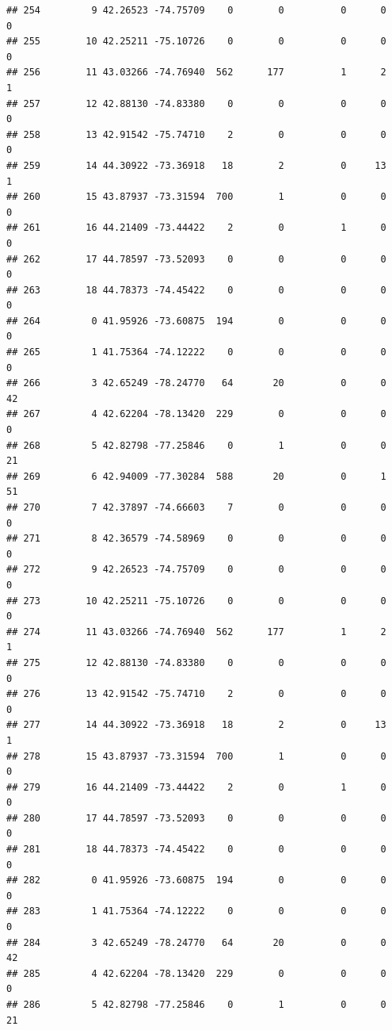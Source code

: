 \documentclass[
]{article}
\begin{document}
\begin{verbatim}
## 254         9 42.26523 -74.75709    0        0          0      0            0
## 255        10 42.25211 -75.10726    0        0          0      0            0
## 256        11 43.03266 -74.76940  562      177          1      2            1
## 257        12 42.88130 -74.83380    0        0          0      0            0
## 258        13 42.91542 -75.74710    2        0          0      0            0
## 259        14 44.30922 -73.36918   18        2          0     13            1
## 260        15 43.87937 -73.31594  700        1          0      0            0
## 261        16 44.21409 -73.44422    2        0          1      0            0
## 262        17 44.78597 -73.52093    0        0          0      0            0
## 263        18 44.78373 -74.45422    0        0          0      0            0
## 264         0 41.95926 -73.60875  194        0          0      0            0
## 265         1 41.75364 -74.12222    0        0          0      0            0
## 266         3 42.65249 -78.24770   64       20          0      0           42
## 267         4 42.62204 -78.13420  229        0          0      0            0
## 268         5 42.82798 -77.25846    0        1          0      0           21
## 269         6 42.94009 -77.30284  588       20          0      1           51
## 270         7 42.37897 -74.66603    7        0          0      0            0
## 271         8 42.36579 -74.58969    0        0          0      0            0
## 272         9 42.26523 -74.75709    0        0          0      0            0
## 273        10 42.25211 -75.10726    0        0          0      0            0
## 274        11 43.03266 -74.76940  562      177          1      2            1
## 275        12 42.88130 -74.83380    0        0          0      0            0
## 276        13 42.91542 -75.74710    2        0          0      0            0
## 277        14 44.30922 -73.36918   18        2          0     13            1
## 278        15 43.87937 -73.31594  700        1          0      0            0
## 279        16 44.21409 -73.44422    2        0          1      0            0
## 280        17 44.78597 -73.52093    0        0          0      0            0
## 281        18 44.78373 -74.45422    0        0          0      0            0
## 282         0 41.95926 -73.60875  194        0          0      0            0
## 283         1 41.75364 -74.12222    0        0          0      0            0
## 284         3 42.65249 -78.24770   64       20          0      0           42
## 285         4 42.62204 -78.13420  229        0          0      0            0
## 286         5 42.82798 -77.25846    0        1          0      0           21

\end{verbatim}
\end{document}
